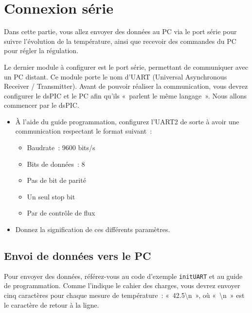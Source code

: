 \documentclass[11pt,a4paper]{article}
\theoremstyle{definition}%
\begin{document}


\section{Connexion série}
Dans cette partie, vous allez envoyer des données au PC via le port série pour suivre l'évolution de la température, ainsi que recevoir des commandes du PC pour régler la régulation.

Le dernier module à configurer est le port série, permettant de communiquer avec un PC distant.
Ce module porte le nom d’UART (Universal Asynchronous Receiver / Transmitter).
Avant de pouvoir réaliser la communication, vous devrez configurer le dsPIC et le PC afin qu’ils «~parlent le même langage~».
Nous allons commencer par le dsPIC.

\begin{itemize}
	\item À l’aide du guide programmation, configurez l’UART2 de sorte à avoir une communication respectant le format suivant~:
	\begin{itemize}
		\item Baudrate~: 9600 bits/s
		\item Bits de données~: 8
		\item Pas de bit de parité
		\item Un seul stop bit
		\item Par de contrôle de flux
	\end{itemize}
	\item Donnez la signification de ces différents paramètres.
\end{itemize}

\subsection{Envoi de données vers le PC}
Pour envoyer des données, référez-vous au code d'exemple \texttt{initUART} et au guide de programmation.
Comme l'indique le cahier des charges, vous devrez envoyer cinq caractères pour chaque mesure de température~: «~42.5\textbackslash n~», où «~\textbackslash n~» est le caractère de retour à la ligne.
\end{document}
